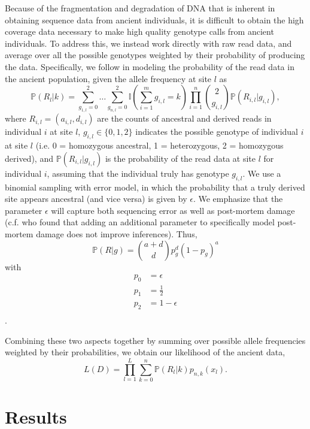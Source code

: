 \documentclass[11pt, oneside]{article}   	%
\begin{document}
Because of the fragmentation and degradation of DNA that is inherent in obtaining sequence data from ancient individuals, it is difficult to obtain the high coverage data necessary to make high quality genotype calls from ancient individuals. To address this, we instead work directly with raw read data, and average over all the possible genotypes weighted by their probability of producing the data. Specifically, we follow \citet{nielsen2012snp} in modeling the probability of the read data in the ancient population, given the allele frequency at site $l$ as
\[
\mathbb{P}(R_l | k) = \sum_{g_{1,l} = 0}^2 \ldots \sum_{g_{n,l} = 0}^2 \mathbb{I}\left(\sum_{i=1}^m g_{i,l} = k\right) \prod_{i=1}^n \binom{2}{g_{i,l}}\mathbb{P}(R_{i,l} | g_{i,l}),
\]
where $R_{i,l}= (a_{i,l}, d_{i,l})$ are the counts of ancestral and derived reads in individual $i$ at site $l$, $g_{i,l} \in \{0, 1, 2\}$ indicates the possible genotype of individual $i$ at site $l$ (i.e. 0 = homozygous ancestral, 1 = heterozygous, 2 = homozygous derived), and $\mathbb{P}(R_{i,l} | g_{i,l})$ is the probability of the read data at site $l$ for individual $i$, assuming that the individual truly has genotype $g_{i,l}$. We use a binomial sampling with error model, in which the probability that a truly derived site appears ancestral (and vice versa) is given by $\epsilon$. We emphasize that the parameter $\epsilon$ will capture both sequencing error as well as post-mortem damage (c.f. \citet{racimo2016joint} who found that adding an additional parameter to specifically model post-mortem damage does not improve inferences). Thus,
\[
\mathbb{P}(R | g) = \binom{a + d}{d} p_{g}^d(1-p_{g})^a
\]
with
\begin{align*}
p_0 &= \epsilon\\
p_1 &= \frac{1}{2}\\
p_2 &= 1-\epsilon\\
\end{align*}.

Combining these two aspects together by summing over possible allele frequencies weighted by their probabilities, we obtain our likelihood of the ancient data,
\begin{equation}
L(D) = \prod_{l=1}^L \sum_{k = 0}^n \mathbb{P}(R_l | k) p_{n,k}(x_l).
\label{likelihood}
\end{equation}

\section{Results}
\end{document}
